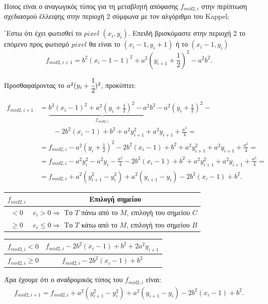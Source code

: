 \begin{exercise}
	Ποιος είναι ο αναγωγικός τύπος για τη μεταβλητή απόφασης $f_{mid2, i}$ στην περίπτωση σχεδιασμού έλλειψης στην περιοχή $2$ σύμφωνα με τον αλγόριθμο του Kappel;
\end{exercise}

\begin{solution}

΄Εστω ότι έχει φωτισθεί το $pixel$ $(x_{i}, y_{i})$. Επειδή βρισκόμαστε στην περιοχή 2 το επόμενο προς φωτισμό $pixel$ θα είναι το $(x_{i}-1, y_{i}+1)$ ή το $(x_{i}-1, y_{i})$ 
$$
 f_{mid2,i+1} = b^2 (x_{i}-1-1)^2 + a^2 (y_{i+1}+\frac{1}{2})^2 -a^2 b^2.
$$

Προσθαφαίροντας το $a^2(y_i + \cfrac{1}{2})^2$, προκύπτει:

\begin{align*}
    f_{mid2,i+1} &= \underbrace{b^2 (x_{i}-1)^2 + a^2 (y_{i}+\frac{1}{2})^2 -a^2 b^2}_\text{$f_{mid2,i}$} -a^2 (y_{i}+\frac{1}{2})^2 - \\
    &\qquad - 2b^2 (x_{i}-1) + b^2 + a^2 y^2_{i+1} + a^2 y_{i+1} + \frac{a^2}{4} = \\
    &= f_{mid2,i} - a^2 (y_{i}+\frac{1}{2})^2 -2b^2 (x_{i}-1) + b^2 + a^2 y^2_{i+1} + a^2 y_{i+1} + \frac{a^2}{4} = \\ 
    &= f_{mid2,i} - a^2 y^2_{i} - a^2 y_{i} - \frac{a^2}{4} -2b^2 (x_{i}-1) + b^2 + a^2 y^2_{i+1} + a^2 y_{i+1} + \frac{a^2}{4} = \\
    &= f_{mid2,i} + a^2 (y^2_{i+1} - y^2_{i}) + a^2 (y_{i+1} - y_{i}) -2b^2 (x_{i}-1) + b^2.
\end{align*}
\begin{table}[htb]
    \centering
    \begin{tabular}{@{}c|c@{}}
        \toprule
        $f_{mid2,i}$ & Επιλογή σημείου \\  \midrule
        $< 0$ & $e_i > 0 \Rightarrow$ Το $T$ πάνω από το $M$, επιλογή του σημείου $C$ \\
        $\geq 0$ & $e_i \leq 0 \Rightarrow$ Το $T$ κάτω από το $M$, επιλογή του σημείου $Β$ \\
        \bottomrule
    \end{tabular}
\end{table}
\begin{table}[htb]
    \centering
    \begin{tabular}{@{}c|c@{}} 
        \toprule
        $f_{mid2,i}<0$ &$ f_{mid2,i} -2b^2 (x_{i}-1) + b^2 + 2a^2 y_{i+1}$\\  \midrule
        $f_{mid2,i} \geq 0$ &$ f_{mid2,i} -2b^2 (x_{i}-1) + b^2 $\\
        \bottomrule  
    \end{tabular}
\end{table}
Άρα έχουμε ότι ο αναδρομικός τύπος του $f_{mid2,i}$ είναι:
\begin{gather*}
   f_{mid2,i+1} = f_{mid2,i} + a^2 (y^2_{i+1} - y^2_{i}) + a^2 (y_{i+1} - y_{i}) -2b^2 (x_{i}-1) + b^2.
\end{gather*}



\end{solution}
